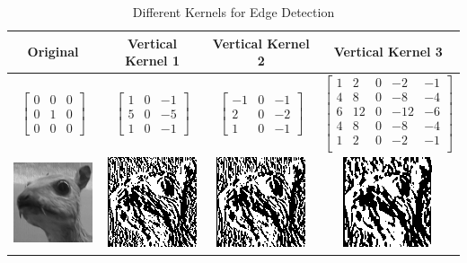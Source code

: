 \begin{table}
  \centering
  \begin{tabular}{cccc}
     \hline
     Original & Vertical Kernel 1 & Vertical Kernel 2 & Vertical Kernel 3\\
      \hline
      $\left[ {\begin{array}{ccc}  0&0&0 \\  0&1&0 \\  0&0&0\end{array}} \right] $
      & $\left[ {\begin{array}{ccc}  1&0&-1 \\  5&0&-5 \\  1&0&-1\end{array}} \right] $
      &$\left[ {\begin{array}{ccc}  -1&0&-1 \\  2&0&-2 \\  1&0&-1\end{array}} \right] $
      & $\left[ {\begin{array}{ccccc}   1     & 2     & 0     & -2    & -1 \\    4     & 8     & 0     & -8    & -4 \\    6     & 12    & 0     & -12   & -6 \\    4     & 8     & 0     & -8    & -4 \\    1     & 2     & 0     & -2    & -1 \\ \end{array}} \right]$\\
     \hline
     \includegraphics[scale=.5]{fig/gray.png} & \includegraphics[scale=.5]{fig/v1.png}
     &  \includegraphics[scale=.5]{fig/v2.png}  &  \includegraphics[scale=.5]{fig/v4.png}\\
     \hline
   \end{tabular}
  \caption{Different Kernels for Edge Detection}\label{tab:edge}
\end{table}

